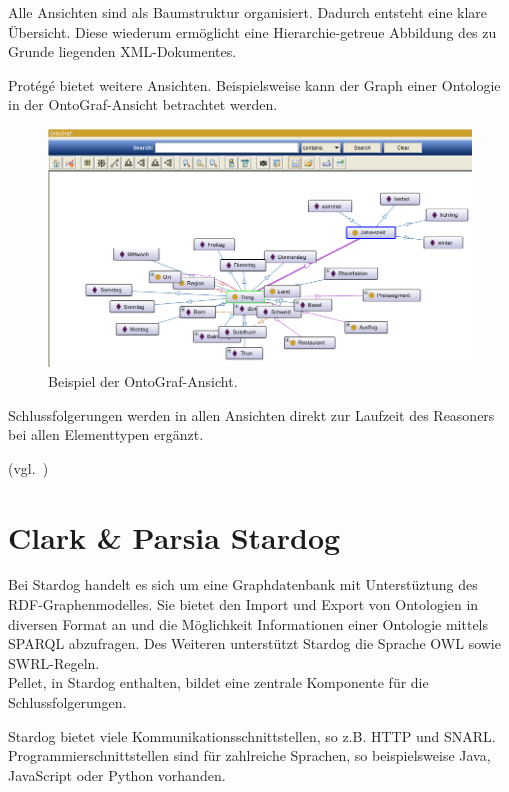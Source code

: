 Alle Ansichten sind als Baumstruktur organisiert. Dadurch entsteht eine klare Übersicht. Diese wiederum ermöglicht eine Hierarchie-getreue Abbildung des zu Grunde liegenden XML-Dokumentes.

Protégé bietet weitere Ansichten. Beispielsweise kann der Graph einer Ontologie in der OntoGraf-Ansicht betrachtet werden.

\begin{figure}[H]%
    \centering
    \includegraphics[scale=0.7]{bilder/OntoGraf.png}
    \caption{Beispiel der OntoGraf-Ansicht.\label{fig:kompo:ontograf}\protect\footnotemark}
\end{figure}

Schlussfolgerungen werden in allen Ansichten direkt zur Laufzeit des Reasoners bei allen Elementtypen ergänzt.

(vgl.~\cite{protegeView})

\section{Clark \& Parsia Stardog}
\label{sec:komponenten_stardog}
Bei Stardog handelt es sich um eine Graphdatenbank mit Unterstüztung des RDF-Graphenmodelles. Sie bietet den Import und Export von Ontologien in diversen Format an und die Möglichkeit Informationen einer Ontologie mittels SPARQL abzufragen. Des Weiteren unterstützt Stardog die Sprache OWL sowie SWRL-Regeln.\\
Pellet, in Stardog enthalten, bildet eine zentrale Komponente für die Schlussfolgerungen.

Stardog bietet viele Kommunikationsschnittstellen, so z.B. HTTP und SNARL.\\
Programmierschnittstellen sind für zahlreiche Sprachen, so beispielsweise Java, JavaScript oder Python vorhanden.

